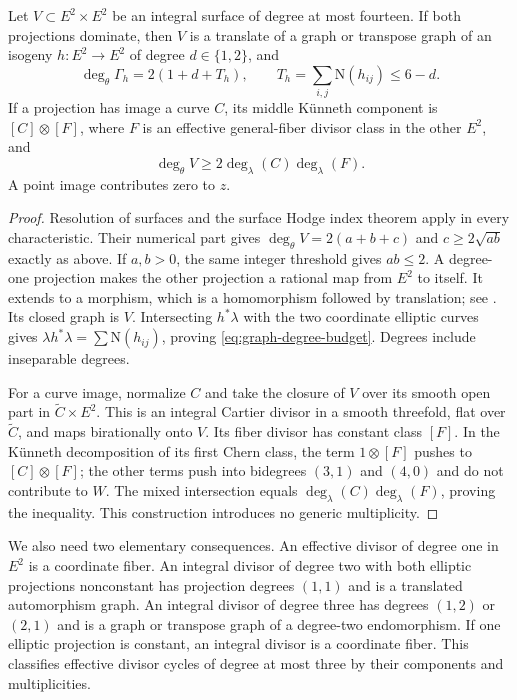 \begin{lemma}
\label{lem:lowdegree-geometry}
Let $V\subset E^2\times E^2$ be an integral surface of degree at most fourteen.
If both projections dominate, then $V$ is a translate of a graph or transpose graph of an isogeny $h:E^2\to E^2$ of degree $d\in\{1,2\}$, and
\begin{equation}
\label{eq:graph-degree-budget}
 \deg_\theta\Gamma_h=2(1+d+T_h),\qquad
 T_h=\sum_{i,j}\mathrm N(h_{ij})\leq6-d.
\end{equation}
If a projection has image a curve $C$, its middle K\"unneth component is $[C]\otimes[F]$, where $F$ is an effective general-fiber divisor class in the other $E^2$, and
\begin{equation}
\label{eq:fiber-degree-budget}
 \deg_\theta V\geq2\deg_\lambda(C)\deg_\lambda(F).
\end{equation}
A point image contributes zero to $z$.
\end{lemma}
\begin{proof}
Resolution of surfaces and the surface Hodge index theorem apply in every characteristic.  Their numerical part gives
$\deg_\theta V=2(a+b+c)$ and $c\geq2\sqrt{ab}$ exactly as above.  If $a,b>0$, the same integer threshold gives $ab\leq2$.  A degree-one projection makes the other projection a rational map from $E^2$ to itself.  It extends to a morphism, which is a homomorphism followed by translation; see \cite[Corollary 2.2 and Theorem 3.1]{MilneAV}.  Its closed graph is $V$.  Intersecting $h^*\lambda$ with the two coordinate elliptic curves gives $\lambda h^*\lambda=\sum\mathrm N(h_{ij})$, proving \eqref{eq:graph-degree-budget}.  Degrees include inseparable degrees.

For a curve image, normalize $C$ and take the closure of $V$ over its smooth open part in $\widetilde C\times E^2$.  This is an integral Cartier divisor in a smooth threefold, flat over $\widetilde C$, and maps birationally onto $V$.  Its fiber divisor has constant class $[F]$.  In the K\"unneth decomposition of its first Chern class, the term $1\otimes[F]$ pushes to $[C]\otimes[F]$; the other terms push into bidegrees $(3,1)$ and $(4,0)$ and do not contribute to $W$.  The mixed intersection equals $\deg_\lambda(C)\deg_\lambda(F)$, proving the inequality.  This construction introduces no generic multiplicity.
\end{proof}

We also need two elementary consequences.  An effective divisor of degree one in $E^2$ is a coordinate fiber.  An integral divisor of degree two with both elliptic projections nonconstant has projection degrees $(1,1)$ and is a translated automorphism graph.  An integral divisor of degree three has degrees $(1,2)$ or $(2,1)$ and is a graph or transpose graph of a degree-two endomorphism.  If one elliptic projection is constant, an integral divisor is a coordinate fiber.  This classifies effective divisor cycles of degree at most three by their components and multiplicities.

